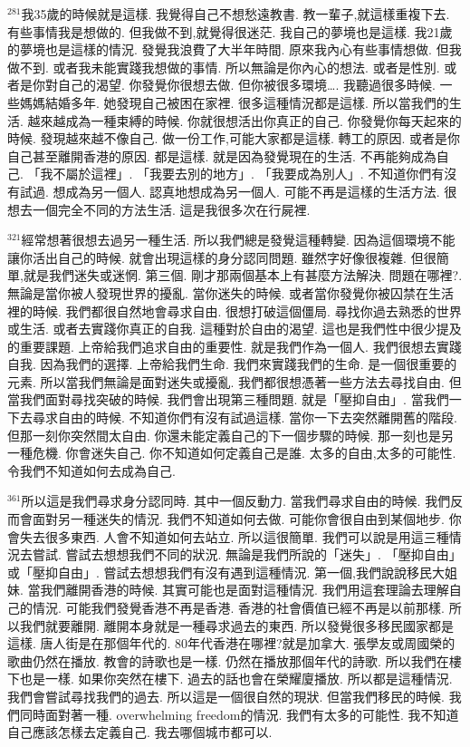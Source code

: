 \documentclass{book}
\begin{document}
$^{281}$我35歲的時候就是這樣.
我覺得自己不想愁遠教書.
教一輩子,就這樣重複下去.
有些事情我是想做的.
但我做不到,就覺得很迷茫.
我自己的夢境也是這樣.
我21歲的夢境也是這樣的情況.
發覺我浪費了大半年時間.
原來我內心有些事情想做.
但我做不到.
或者我未能實踐我想做的事情.
所以無論是你內心的想法.
或者是性別.
或者是你對自己的渴望.
你發覺你很想去做.
但你被很多環境….
我聽過很多時候.
一些媽媽結婚多年.
她發現自己被困在家裡.
很多這種情況都是這樣.
所以當我們的生活.
越來越成為一種束縛的時候.
你就很想活出你真正的自己.
你發覺你每天起來的時候.
發現越來越不像自己.
做一份工作,可能大家都是這樣.
轉工的原因.
或者是你自己甚至離開香港的原因.
都是這樣.
就是因為發覺現在的生活.
不再能夠成為自己.
「我不屬於這裡」.
「我要去別的地方」.
「我要成為別人」.
不知道你們有沒有試過.
想成為另一個人.
認真地想成為另一個人.
可能不再是這樣的生活方法.
很想去一個完全不同的方法生活.
這是我很多次在行屍裡.

$^{321}$經常想著很想去過另一種生活.
所以我們總是發覺這種轉變.
因為這個環境不能讓你活出自己的時候.
就會出現這樣的身分認同問題.
雖然字好像很複雜.
但很簡單,就是我們迷失或迷惘.
第三個.
剛才那兩個基本上有甚麼方法解決.
問題在哪裡?.
無論是當你被人發現世界的擾亂.
當你迷失的時候.
或者當你發覺你被囚禁在生活裡的時候.
我們都很自然地會尋求自由.
很想打破這個僵局.
尋找你過去熟悉的世界或生活.
或者去實踐你真正的自我.
這種對於自由的渴望.
這也是我們性中很少提及的重要課題.
上帝給我們追求自由的重要性.
就是我們作為一個人.
我們很想去實踐自我.
因為我們的選擇.
上帝給我們生命.
我們來實踐我們的生命.
是一個很重要的元素.
所以當我們無論是面對迷失或擾亂.
我們都很想憑著一些方法去尋找自由.
但當我們面對尋找突破的時候.
我們會出現第三種問題.
就是「壓抑自由」.
當我們一下去尋求自由的時候.
不知道你們有沒有試過這樣.
當你一下去突然離開舊的階段.
但那一刻你突然間太自由.
你還未能定義自己的下一個步驟的時候.
那一刻也是另一種危機.
你會迷失自己.
你不知道如何定義自己是誰.
太多的自由,太多的可能性.
令我們不知道如何去成為自己.

$^{361}$所以這是我們尋求身分認同時.
其中一個反動力.
當我們尋求自由的時候.
我們反而會面對另一種迷失的情況.
我們不知道如何去做.
可能你會很自由到某個地步.
你會失去很多東西.
人會不知道如何去站立.
所以這很簡單.
我們可以說是用這三種情況去嘗試.
嘗試去想想我們不同的狀況.
無論是我們所說的「迷失」.
「壓抑自由」或「壓抑自由」.
嘗試去想想我們有沒有遇到這種情況.
第一個,我們說說移民大姐妹.
當我們離開香港的時候.
其實可能也是面對這種情況.
我們用這套理論去理解自己的情況.
可能我們發覺香港不再是香港.
香港的社會價值已經不再是以前那樣.
所以我們就要離開.
離開本身就是一種尋求過去的東西.
所以發覺很多移民國家都是這樣.
唐人街是在那個年代的.
80年代香港在哪裡?就是加拿大.
張學友或周國榮的歌曲仍然在播放.
教會的詩歌也是一樣.
仍然在播放那個年代的詩歌.
所以我們在樓下也是一樣.
如果你突然在樓下.
過去的話也會在榮耀廈播放.
所以都是這種情況.
我們會嘗試尋找我們的過去.
所以這是一個很自然的現狀.
但當我們移民的時候.
我們同時面對著一種.
overwhelming freedom的情況.
我們有太多的可能性.
我不知道自己應該怎樣去定義自己.
我去哪個城市都可以.
\end{document}
